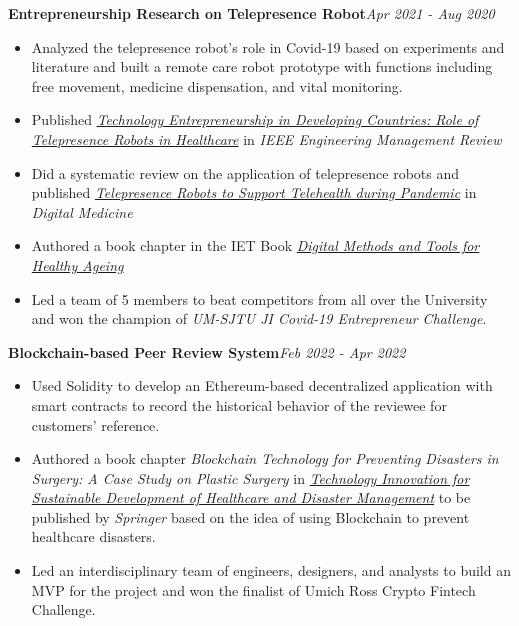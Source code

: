 \documentclass[10pt,a4paper]{article}
\begin{document}
\textbf{Entrepreneurship Research on Telepresence Robot}\hfill \emph{Apr 2021 - Aug 2020}
\begin{itemize}[noitemsep,topsep=0pt]
\item Analyzed the telepresence robot's role in Covid-19 based on experiments and literature and built a remote care robot prototype with functions including free movement, medicine dispensation, and vital monitoring.
\item Published \href{https://ieeexplore.ieee.org/document/9330532}{\emph{Technology Entrepreneurship in Developing Countries: Role of Telepresence Robots in Healthcare}} in \emph{IEEE Engineering Management Review}
\item Did a systematic review on the application of telepresence robots and published \href{https://journals.lww.com/dm/fulltext/2022/08010/Telepresence_robots_to_support_telehealth_during.30.aspx}{\emph{Telepresence Robots to Support Telehealth during Pandemic}} in \emph{Digital Medicine}
\item Authored a book chapter in the IET Book \href{https://shop.theiet.org/digital-tools-and-methods-to-support-healthy-ageing}{\emph{Digital Methods and Tools for Healthy Ageing}}
\item Led a team of 5 members to beat competitors from all over the University and won the champion of \emph{UM-SJTU JI Covid-19 Entrepreneur Challenge}.\\
\end{itemize}
\textbf{Blockchain-based Peer Review System}\hfill\emph{Feb 2022 - Apr 2022}
\begin{itemize}[noitemsep,topsep=0pt]
    \item Used Solidity to develop an Ethereum-based decentralized application with smart contracts to record the historical behavior of the reviewee for customers' reference.
    \item Authored a book chapter \emph{Blockchain Technology for Preventing Disasters in Surgery: A Case Study on Plastic Surgery} in \href{https://link.springer.com/book/9789819720484}{\emph{Technology Innovation for Sustainable Development of Healthcare and Disaster Management}} to be published by \emph{Springer} based on the idea of using Blockchain to prevent healthcare disasters.
    \item Led an interdisciplinary team of engineers, designers, and analysts to build an MVP for the project and won the finalist of Umich Ross Crypto Fintech Challenge.
\end{itemize}
\noindent\\
\end{document}
